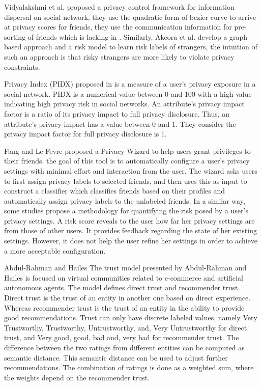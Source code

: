 Vidyalakshmi et al. \cite{b.s._privacy_2015} proposed a privacy control framework for information dispersal on social network,
	they use the quadratic form of bezier curve to arrive at privacy scores for friends,
	they use the communication information for pre-sorting of friends which is lacking in \cite{vidyalakshmi_privacy_2015}.
Similarly,
Akcora et al. \cite{akcora_risks_2012} develop a graph-based approach and a risk model to learn risk labels of strangers,
	the intuition of such an approach is that risky strangers are more likely to violate privacy constraints.

Privacy Index (PIDX) proposed in \cite{nepali_sonet_2013} is a measure of a user’s privacy exposure in a social network.
PIDX is a numerical value between 0 and 100 with a high value indicating high privacy risk in social networks.
An attribute’s privacy impact factor is a ratio of its privacy impact to full privacy disclosure.
Thus,
	an attribute’s privacy impact has a value between 0 and 1.
They consider the privacy impact factor for full privacy disclosure is 1.

Fang and Le Fevre \cite{fang_privacy_2010} proposed a Privacy Wizard to help users grant privileges to their friends.
	the goal of this tool is to automatically configure a user’s privacy settings with minimal effort and interaction from the user.
The wizard asks users to first assign privacy labels to selected friends,
	and then uses this as input to construct a classifier which classifies friends based on their profiles and automatically assign privacy labels to the unlabeled friends.
In a similar way,
	some studies \cite{maximilien_privacyasaservice_2009} propose a methodology for quantifying the risk posed by a user’s privacy settings.
A risk score reveals to the user how far her privacy settings are from those of other users.
It provides feedback regarding the state of her existing settings.
However,
	it does not help the user refine her settings in order to achieve a more acceptable configuration.

Abdul-Rahman and Hailes The trust model presented by Abdul-Rahman and Hailes \cite{abdul-rahman_supporting_2000} 
	is focused on virtual communities related to e-commerce and artificial autonomous agents.
The model defines direct trust and recommender trust.
Direct trust is the trust of an entity in another one based on direct experience.
Whereas recommender trust is the trust of an entity in the ability to provide good recommendations.
Trust can only have discrete labeled values,
	namely Very Trustworthy,
	Trustworthy,
	Untrustworthy,
	and,
	Very Untrustworthy for direct trust,
	and Very good,
	good,
	bad and,
	very bad for recommender trust.
The difference between the two ratings from different entities can be computed as semantic distance.
This semantic distance can be used to adjust further recommendations.
The combination of ratings is done as a weighted sum,
	where the weights depend on the recommender trust.

